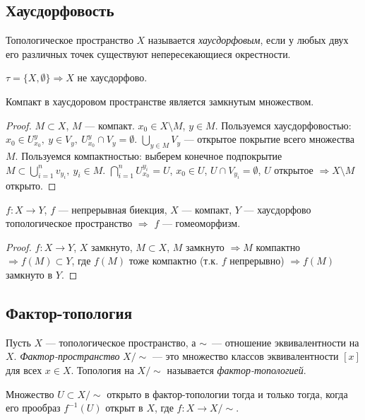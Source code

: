 \subsection{Хаусдорфовость}
\begin{definition}
    Топологическое пространство $X$ называется \textit{хаусдорфовым}, если у любых двух его различных точек существуют непересекающиеся окрестности.
\end{definition}

$\tau = \{X, \emptyset\} \Rightarrow X$ не хаусдорфово.

\begin{lemma}
    Компакт в хаусдоровом пространстве является замкнутым множеством.
\end{lemma}
\begin{proof}
    $M \subset X$, $M$ — компакт.
    $x_0 \in X \setminus M$, $y \in M$.
    Пользуемся хаусдорфовостью: $x_0 \in U_{x_0}^y, \ y \in V_y, \ U_{x_0}^y \cap V_y = \emptyset$.
    $\bigcup_{y \in M} V_y$ — открытое покрытие всего множества $M$.
    Пользуемся компактностью: выберем конечное подпокрытие $M \subset \bigcup_{i = 1}^n v_{y_i}, \ y_i \in M$.
    $\bigcap_{i = 1}^n U_{x_0}^{y_i} = U$, $x_0 \in U$, $U \cap V_{y_i} = \emptyset$, $U$ открытое $\Rightarrow X \setminus M$ открыто.
\end{proof}

\begin{statement}
    $f: X \to Y$, $f$ — непрерывная биекция, $X$ — компакт, $Y$ — хаусдорфово топологическое пространство $\Longrightarrow$ $f$ — гомеоморфизм.
\end{statement}
\begin{proof}
    $f: X \to Y$, $X$ замкнуто, $M \subset X$, $M$ замкнуто $\Rightarrow M$ компактно $\Rightarrow f(M) \subset Y$, где $f(M)$ тоже компактно (т.к. $f$ непрерывно) $\Rightarrow f(M)$ замкнуто в $Y$. 
\end{proof}


\subsection{Фактор-топология}


\begin{definition}
    Пусть $X$ — топологическое пространство, а $\sim$ — отношение эквивалентности на $X$. \textit{Фактор-пространство} $X / \sim$ — это множество классов эквивалентности $[x]$ для всех $x \in X$. Топология на $X / \sim$ называется \textit{фактор-топологией}.

    Множество $U \subset X / \sim $ открыто в фактор-топологии тогда и только тогда, когда его прообраз $f^{-1}(U)$ открыт в $X$, где $f: X \to X / \sim$.
\end{definition}

